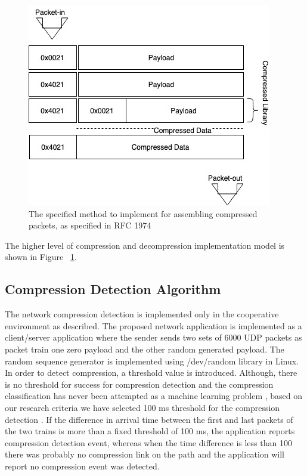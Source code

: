 \documentclass[sigconf]{acmart}
\begin{document}
\begin{figure}[h]
  \centering
  \includegraphics[width=\linewidth]{compression}
  \caption{The specified method to implement for assembling compressed packets, as specified in RFC 1974\cite{Deutsch:1996:ZCD:RFC1950}}
  \label{comp}
\end{figure}

The higher level of compression and decompression implementation model is shown in Figure ~\ref{comp}.
\subsection{Compression Detection Algorithm}
The network compression detection is implemented only in the cooperative environment as described. The proposed network application is implemented as a client/server application where the sender sends two sets of 6000 UDP packets as packet train one zero payload and the other random generated payload. The random sequence generator is implemented using /dev/random library in Linux. In order to detect compression, a threshold value is introduced. Although, there is no threshold for success for compression detection and the compression classification has never been attempted as a machine learning problem \cite{hahn2018detecting}, based on our research criteria we have selected 100 ms threshold for the compression detection .  If the difference in arrival time between the first and last packets of the two trains is more than a fixed threshold of 100 ms, the application reports compression detection event, whereas when the time difference is less than 100 there was probably no compression link on the path and the application will report no compression event was detected. 
\end{document}

